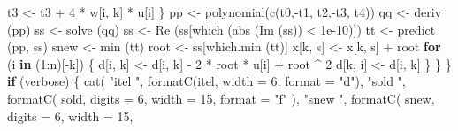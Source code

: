 \documentclass[
  12pt,
  letterpaper,
  DIV=11,
  numbers=noendperiod]{scrreprt}
\newenvironment{Shaded}{\begin{snugshade}}{\end{snugshade}}
\newcommand{\AttributeTok}[1]{\textcolor[rgb]{0.40,0.45,0.13}{#1}}
\newcommand{\ControlFlowTok}[1]{\textcolor[rgb]{0.00,0.23,0.31}{\textbf{#1}}}
\newcommand{\DecValTok}[1]{\textcolor[rgb]{0.68,0.00,0.00}{#1}}
\newcommand{\FloatTok}[1]{\textcolor[rgb]{0.68,0.00,0.00}{#1}}
\newcommand{\FunctionTok}[1]{\textcolor[rgb]{0.28,0.35,0.67}{#1}}
\newcommand{\NormalTok}[1]{\textcolor[rgb]{0.00,0.23,0.31}{#1}}
\newcommand{\OtherTok}[1]{\textcolor[rgb]{0.00,0.23,0.31}{#1}}
\newcommand{\SpecialCharTok}[1]{\textcolor[rgb]{0.37,0.37,0.37}{#1}}
\newcommand{\StringTok}[1]{\textcolor[rgb]{0.13,0.47,0.30}{#1}}
\theoremstyle{remark}
\begin{document}
\begin{Shaded}
\begin{Highlighting}[]
\NormalTok{            t3 }\OtherTok{\textless{}{-}}\NormalTok{ t3 }\SpecialCharTok{+} \DecValTok{4} \SpecialCharTok{*}\NormalTok{ w[i, k] }\SpecialCharTok{*}\NormalTok{ u[i]}
\NormalTok{          \}}
\NormalTok{          pp }\OtherTok{\textless{}{-}} \FunctionTok{polynomial}\NormalTok{(}\FunctionTok{c}\NormalTok{(t0,}\SpecialCharTok{{-}}\NormalTok{t1, t2,}\SpecialCharTok{{-}}\NormalTok{t3, t4))}
\NormalTok{          qq }\OtherTok{\textless{}{-}} \FunctionTok{deriv}\NormalTok{ (pp)}
\NormalTok{          ss }\OtherTok{\textless{}{-}} \FunctionTok{solve}\NormalTok{ (qq)}
\NormalTok{          ss }\OtherTok{\textless{}{-}} \FunctionTok{Re}\NormalTok{ (ss[}\FunctionTok{which}\NormalTok{ (}\FunctionTok{abs}\NormalTok{ (}\FunctionTok{Im}\NormalTok{ (ss)) }\SpecialCharTok{\textless{}} \FloatTok{1e{-}10}\NormalTok{)])}
\NormalTok{          tt }\OtherTok{\textless{}{-}} \FunctionTok{predict}\NormalTok{ (pp, ss)}
\NormalTok{          snew }\OtherTok{\textless{}{-}} \FunctionTok{min}\NormalTok{ (tt)}
\NormalTok{          root }\OtherTok{\textless{}{-}}\NormalTok{ ss[}\FunctionTok{which.min}\NormalTok{ (tt)]}
\NormalTok{          x[k, s] }\OtherTok{\textless{}{-}}\NormalTok{ x[k, s] }\SpecialCharTok{+}\NormalTok{ root}
          \ControlFlowTok{for}\NormalTok{ (i }\ControlFlowTok{in}\NormalTok{ (}\DecValTok{1}\SpecialCharTok{:}\NormalTok{n)[}\SpecialCharTok{{-}}\NormalTok{k]) \{}
\NormalTok{            d[i, k] }\OtherTok{\textless{}{-}}\NormalTok{ d[i, k] }\SpecialCharTok{{-}} \DecValTok{2} \SpecialCharTok{*}\NormalTok{ root }\SpecialCharTok{*}\NormalTok{ u[i] }\SpecialCharTok{+}\NormalTok{ root }\SpecialCharTok{\^{}} \DecValTok{2}
\NormalTok{            d[k, i] }\OtherTok{\textless{}{-}}\NormalTok{ d[i, k]}
\NormalTok{          \}}
\NormalTok{        \}}
\NormalTok{      \}}
      \ControlFlowTok{if}\NormalTok{ (verbose) \{}
        \FunctionTok{cat}\NormalTok{(}
          \StringTok{"itel "}\NormalTok{,}
          \FunctionTok{formatC}\NormalTok{(itel, }\AttributeTok{width =} \DecValTok{6}\NormalTok{, }\AttributeTok{format =} \StringTok{"d"}\NormalTok{),}
          \StringTok{"sold "}\NormalTok{,}
          \FunctionTok{formatC}\NormalTok{(}
\NormalTok{            sold,}
            \AttributeTok{digits =} \DecValTok{6}\NormalTok{,}
            \AttributeTok{width =} \DecValTok{15}\NormalTok{,}
            \AttributeTok{format =} \StringTok{"f"}
\NormalTok{          ),}
          \StringTok{"snew "}\NormalTok{,}
          \FunctionTok{formatC}\NormalTok{(}
\NormalTok{            snew,}
            \AttributeTok{digits =} \DecValTok{6}\NormalTok{,}
            \AttributeTok{width =} \DecValTok{15}\NormalTok{,}

\end{Highlighting}
\end{Shaded}
\end{document}
